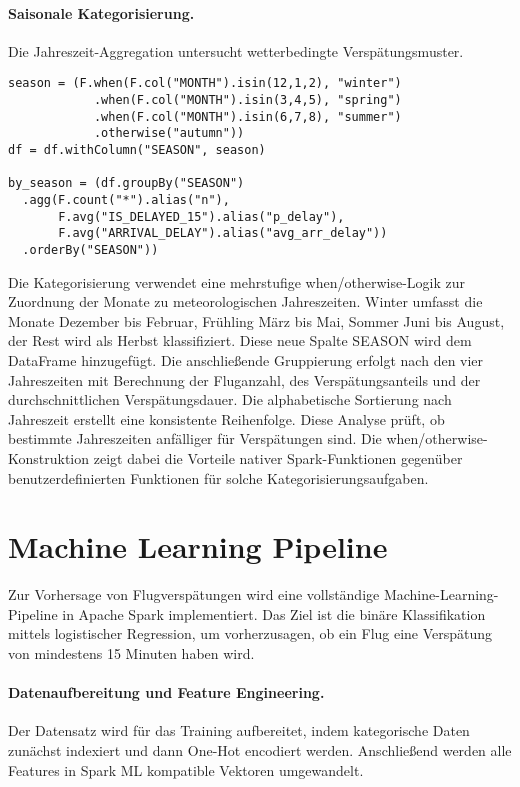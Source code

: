 \documentclass[a4paper,11pt]{article}
\begin{document}
\paragraph{Saisonale Kategorisierung.} Die Jahreszeit-Aggregation untersucht wetterbedingte Verspätungsmuster.

\begin{verbatim}
season = (F.when(F.col("MONTH").isin(12,1,2), "winter")
            .when(F.col("MONTH").isin(3,4,5), "spring")
            .when(F.col("MONTH").isin(6,7,8), "summer")
            .otherwise("autumn"))
df = df.withColumn("SEASON", season)

by_season = (df.groupBy("SEASON")
  .agg(F.count("*").alias("n"),
       F.avg("IS_DELAYED_15").alias("p_delay"),
       F.avg("ARRIVAL_DELAY").alias("avg_arr_delay"))
  .orderBy("SEASON"))
\end{verbatim}

Die Kategorisierung verwendet eine mehrstufige when/otherwise-Logik zur Zuordnung der Monate zu meteorologischen Jahreszeiten. Winter umfasst die Monate Dezember bis Februar, Frühling März bis Mai, Sommer Juni bis August, der Rest wird als Herbst klassifiziert. Diese neue Spalte SEASON wird dem DataFrame hinzugefügt. Die anschließende Gruppierung erfolgt nach den vier Jahreszeiten mit Berechnung der Fluganzahl, des Verspätungsanteils und der durchschnittlichen Verspätungsdauer. Die alphabetische Sortierung nach Jahreszeit erstellt eine konsistente Reihenfolge. Diese Analyse prüft, ob bestimmte Jahreszeiten anfälliger für Verspätungen sind. Die when/otherwise-Konstruktion zeigt dabei die Vorteile nativer Spark-Funktionen gegenüber benutzerdefinierten Funktionen für solche Kategorisierungsaufgaben.

\section{Machine Learning Pipeline}

Zur Vorhersage von Flugverspätungen wird eine vollständige Machine-Learning-Pipeline in Apache Spark implementiert. Das Ziel ist die binäre Klassifikation mittels logistischer Regression, um vorherzusagen, ob ein Flug eine Verspätung von mindestens 15 Minuten haben wird.

\paragraph{Datenaufbereitung und Feature Engineering.} Der Datensatz wird für das Training aufbereitet, indem kategorische Daten zunächst indexiert und dann One-Hot encodiert werden. Anschließend werden alle Features in Spark ML kompatible Vektoren umgewandelt.
\end{document}
